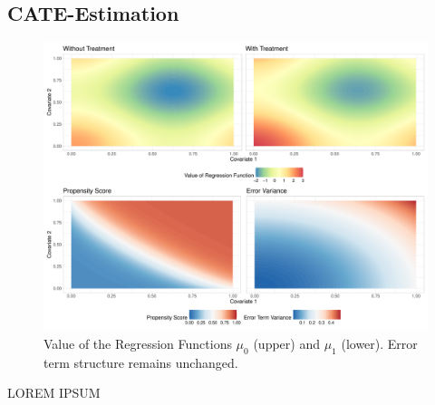\subsection{CATE-Estimation}

\begin{figure}[H]
	\centering
	\includegraphics[width = \textwidth]{../Graphics/CATE_Exmp1.pdf}
	\caption{Value of the Regression Functions $\mu_0$ (upper) and $\mu_1$ (lower).	Error term structure remains unchanged.}
	\label{fig:CATE_surfaces}
\end{figure}

{\color{red} LOREM IPSUM}